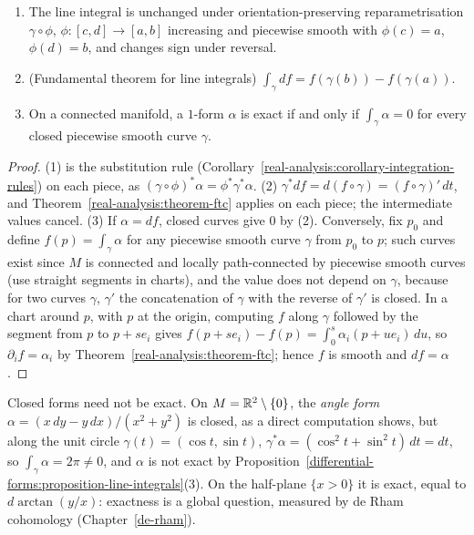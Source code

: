 \begin{proposition}\label{differential-forms:proposition-line-integrals}
\begin{enumerate}
\item The line integral is unchanged under orientation-preserving reparametrisation $\gamma \circ \phi$, $\phi \colon [c, d] \to [a, b]$ increasing and piecewise smooth with $\phi(c) = a$, $\phi(d) = b$, and changes sign under reversal.
\item (Fundamental theorem for line integrals) $\int_\gamma df = f(\gamma(b)) - f(\gamma(a))$.
\item On a connected manifold, a $1$-form $\alpha$ is exact if and only if $\int_\gamma\alpha = 0$ for every closed piecewise smooth curve $\gamma$.
\end{enumerate}
\end{proposition}

\begin{proof}
(1) is the substitution rule (Corollary~\ref{real-analysis:corollary-integration-rules}) on each piece, as $(\gamma \circ \phi)^*\alpha = \phi^*\gamma^*\alpha$. (2) $\gamma^*df = d(f \circ \gamma) = (f \circ \gamma)'\,dt$, and
Theorem~\ref{real-analysis:theorem-ftc} applies on each piece; the intermediate values cancel. (3) If $\alpha = df$, closed curves give $0$ by (2). Conversely, fix $p_0$ and define $f(p) = \int_\gamma\alpha$ for any piecewise smooth curve
$\gamma$ from $p_0$ to $p$; such curves exist since $M$ is connected and locally path-connected by piecewise smooth curves (use straight segments in charts), and the value does not depend on $\gamma$, because for two
curves $\gamma$, $\gamma'$ the concatenation of $\gamma$ with the reverse of $\gamma'$ is closed. In a chart around $p$, with $p$ at the origin, computing $f$ along $\gamma$ followed by the segment from $p$ to $p + se_i$ gives
$f(p + se_i) - f(p) = \int_0^s\alpha_i(p + ue_i)\,du$, so $\partial_if = \alpha_i$ by Theorem~\ref{real-analysis:theorem-ftc}; hence $f$ is smooth and $df = \alpha$.
\end{proof}

\begin{counterexample}\label{differential-forms:counterexample-closed-not-exact}
Closed forms need not be exact. On $M = \mathbb{R}^2 \setminus \{0\}$, the \emph{angle form} $\alpha = (x\,dy - y\,dx)/(x^2 + y^2)$ is closed, as a direct computation shows, but along the unit circle $\gamma(t) = (\cos t, \sin t)$,
$\gamma^*\alpha = (\cos^2t + \sin^2t)\,dt = dt$, so $\int_\gamma\alpha = 2\pi \neq 0$, and $\alpha$ is not exact by Proposition~\ref{differential-forms:proposition-line-integrals}(3). On the half-plane $\{x > 0\}$ it is exact, equal to
$d\arctan(y/x)$: exactness is a global question, measured by de Rham cohomology (Chapter~\ref{de-rham}).
\end{counterexample}

